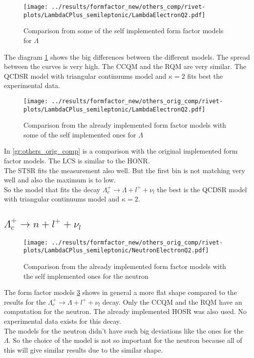 \begin{figure}[h]
  \centering
  \texttt{[image: ../results/formfactor\_new/others\_comp/rivet-plots/LambdaCPlus\_semileptonic/LambdaElectronQ2.pdf]}
  \caption{Comparison from some of the self implemented form factor models for \(\Lambda\)} \label{gr:others_comp}
\end{figure}
The diagram {\ref{gr:others_comp}} shows the big differences between the 
different models. The spread between the curves is very high. The CCQM and 
the RQM are very similar. The QCDSR model with triangular continuums model 
and \(\kappa = 2\) fits best the experimental data.\\

\begin{figure}[h]
  \centering
  \texttt{[image: ../results/formfactor\_new/others\_orig\_comp/rivet-plots/LambdaCPlus\_semileptonic/LambdaElectronQ2.pdf]}
  \caption{Comparison from the already implemented form factor models with 
  some of the self implemented ones for \(\Lambda\)} \label{gr:others_orig_comp}
\end{figure}
In {\eqref{gr:others_orig_comp}} is a comparison with the original implemented 
form factor models. The LCS is similar to the HONR.\\
The STSR fits the measurement also well. But the first bin is not matching 
very well and also the maximum is to low.\\

So the model that fits the decay \(\Lambda_c^+ \rightarrow \Lambda + l^+ + \nu_l\) 
the best is the QCDSR model with triangular continuums model and \(\kappa = 2\).


\clearpage
\subsection{\(\Lambda_c^+ \rightarrow n + l^+ + \nu_l\)}
\begin{figure}[h]
  \centering
  \texttt{[image: ../results/formfactor\_new/others\_orig\_comp/rivet-plots/LambdaCPlus\_semileptonic/NeutronElectronQ2.pdf]}
  \caption{Comparison from the already implemented form factor models with 
  the self implemented ones for the neutron} \label{gr:others_orig_comp_n}
\end{figure}
The form factor models {\ref{gr:others_orig_comp_n}} shows in general a more 
flat shape compared to the results for the \(\Lambda_c^+ \rightarrow \Lambda + l^+ + \nu_l\) 
decay. Only the CCQM and the RQM have an computation for the neutron.
The already implemented HOSR was also used. No experimental data exists for this 
decay.\\ 
The models for the neutron didn't have such big deviations like the ones for the \(\Lambda\). 
So the choice of the model is not so important for the neutron because all of this 
will give similar results due to the similar shape.

